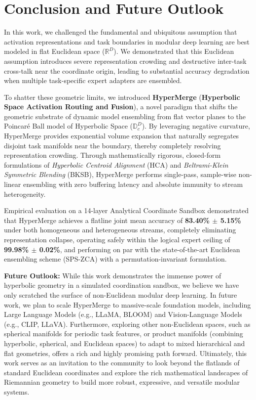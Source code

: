 \section{Conclusion and Future Outlook}
\label{sec:conclusion}

In this work, we challenged the fundamental and ubiquitous assumption that activation representations and task boundaries in modular deep learning are best modeled in flat Euclidean space ($\mathbb{R}^D$). We demonstrated that this Euclidean assumption introduces severe representation crowding and destructive inter-task cross-talk near the coordinate origin, leading to substantial accuracy degradation when multiple task-specific expert adapters are ensembled.

To shatter these geometric limits, we introduced \textbf{HyperMerge} (\textbf{Hyperbolic Space Activation Routing and Fusion}), a novel paradigm that shifts the geometric substrate of dynamic model ensembling from flat vector planes to the Poincaré Ball model of Hyperbolic Space ($\mathbb{D}_c^D$). By leveraging negative curvature, HyperMerge provides exponential volume expansion that naturally segregates disjoint task manifolds near the boundary, thereby completely resolving representation crowding. Through mathematically rigorous, closed-form formulations of \emph{Hyperbolic Centroid Alignment} (HCA) and \emph{Beltrami-Klein Symmetric Blending} (BKSB), HyperMerge performs single-pass, sample-wise non-linear ensembling with zero buffering latency and absolute immunity to stream heterogeneity. 

Empirical evaluation on a 14-layer Analytical Coordinate Sandbox demonstrated that HyperMerge achieves a flatline joint mean accuracy of \textbf{83.40\% $\pm$ 5.15\%} under both homogeneous and heterogeneous streams, completely eliminating representation collapse, operating safely within the logical expert ceiling of \textbf{99.98\% $\pm$ 0.02\%}, and performing on par with the state-of-the-art Euclidean ensembling scheme (SPS-ZCA) with a permutation-invariant formulation.

\textbf{Future Outlook:} 
While this work demonstrates the immense power of hyperbolic geometry in a simulated coordination sandbox, we believe we have only scratched the surface of non-Euclidean modular deep learning. In future work, we plan to scale HyperMerge to massive-scale foundation models, including Large Language Models (e.g., LLaMA, BLOOM) and Vision-Language Models (e.g., CLIP, LLaVA). Furthermore, exploring other non-Euclidean spaces, such as spherical manifolds for periodic task features, or product manifolds (combining hyperbolic, spherical, and Euclidean spaces) to adapt to mixed hierarchical and flat geometries, offers a rich and highly promising path forward. Ultimately, this work serves as an invitation to the community to look beyond the flatlands of standard Euclidean coordinates and explore the rich mathematical landscapes of Riemannian geometry to build more robust, expressive, and versatile modular systems.
